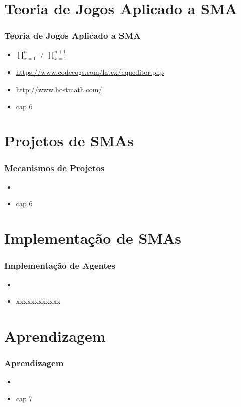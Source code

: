 \documentclass[10pt]{beamer}
\begin{document}
\section{Teoria de Jogos Aplicado a SMA}
\begin{frame}

    \frametitle{Teoria de Jogos Aplicado a SMA}
    \begin{itemize}
    \pause
      \item $\prod^{n}_{x=1} \neq  \prod_{x=1}^{n+1}$
      \item  \url{https://www.codecogs.com/latex/eqneditor.php}
      \item \url{http://www.hostmath.com/}
      

      \pause
      \item cap 6
    
    \end{itemize}
\end{frame}




\section{Projetos de SMAs}
\begin{frame}

    \frametitle{Mecanismos de Projetos}
    \begin{itemize}
    \pause
      \item 
\pause
      \item cap 6
    
    \end{itemize}
\end{frame}




\section{Implementação de SMAs}
\begin{frame}

    \frametitle{Implementação de Agentes}
    \begin{itemize}
    \pause
      \item 
\pause
      \item xxxxxxxxxxxx
    
    \end{itemize}
\end{frame}



\section{Aprendizagem}
\begin{frame}

    \frametitle{Aprendizagem}
    \begin{itemize}
    \pause
      \item 
\pause
      \item cap 7
    
    \end{itemize}
\end{frame}
\end{document}
